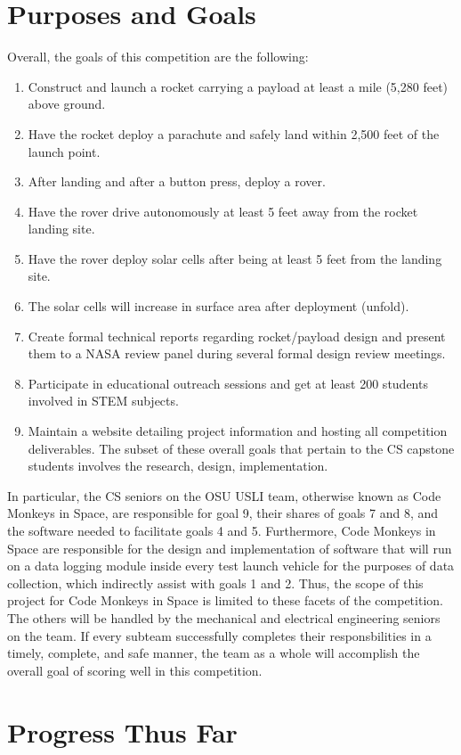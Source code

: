 \documentclass[onecolumn, draftclsnofoot,10pt, compsoc]{IEEEtran}
\begin{document}
\section{Purposes and Goals}
Overall, the goals of this competition are the following:
\begin{enumerate}
\item Construct and launch a rocket carrying a payload at least a mile (5,280 feet) above ground.
\item Have the rocket deploy a parachute and safely land within 2,500 feet of the launch point.
\item After landing and after a button press, deploy a rover.
\item Have the rover drive autonomously at least 5 feet away from the rocket landing site.
\item Have the rover deploy solar cells after being at least 5 feet from the landing site.
\item The solar cells will increase in surface area after deployment (unfold).
\item Create formal technical reports regarding rocket/payload design and present them to a NASA review panel
during several formal design review meetings.
\item Participate in educational outreach sessions and get at least 200 students involved in STEM subjects.
\item Maintain a website detailing project information and hosting all competition deliverables.
The subset of these overall goals that pertain to the CS capstone students involves the research, design, implementation.
\end{enumerate}
In particular, the CS seniors on the OSU USLI team, otherwise known as Code Monkeys in Space, are responsible for goal 9, their shares of goals 7 and 8, and the software needed to facilitate goals 4 and 5. Furthermore, Code Monkeys in Space are responsible for the design and implementation of software that will run on a data logging module inside every test launch vehicle for the purposes of data collection, which indirectly assist with goals 1 and 2. Thus, the scope of this project for Code Monkeys in Space is limited to these facets of the competition. The others will be handled by the mechanical and electrical engineering seniors on the team. If every subteam successfully completes their responsbilities in a timely, complete, and safe manner, the team as a whole will accomplish the overall goal of scoring well in this competition.
\section{Progress Thus Far}
\end{document}
